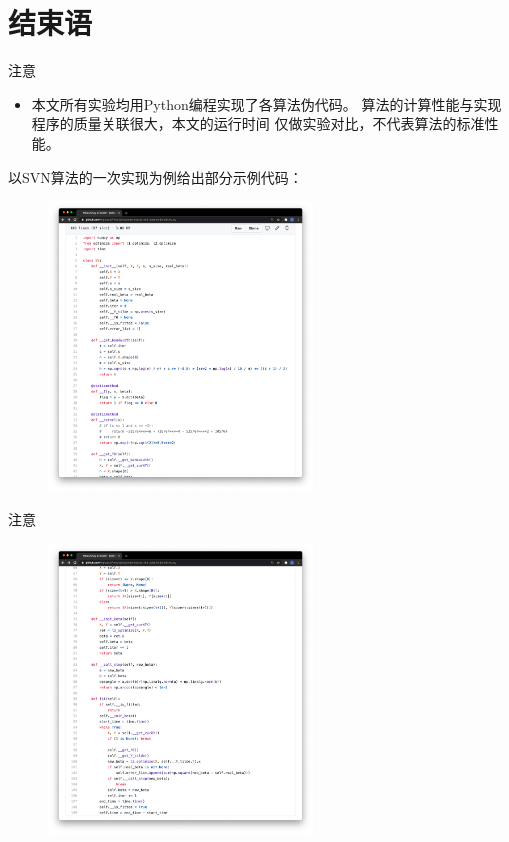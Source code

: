 \section{结束语}
\begin{frame}{注意}
    \begin{itemize}
        \item 本文所有实验均用Python编程实现了各算法伪代码。
        算法的计算性能与实现程序的质量关联很大，本文的运行时间
        仅做实验对比，不代表算法的标准性能。
    \end{itemize} 
    \small 以SVN算法的一次实现为例给出部分示例代码：
    \begin{figure}
        \includegraphics[width=7cm]{pics/code-demo2.png}
    \end{figure}

\end{frame}

\begin{frame}{注意}
    \begin{figure}
        \includegraphics[width=7cm]{pics/code-demo.png}
    \end{figure}
\end{frame}

